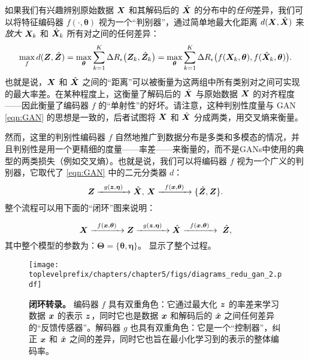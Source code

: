 \documentclass[../../book-main_zh.tex]{subfiles}
\begin{document}
{如果我们有兴趣辨别原始数据 $\bm{X}$ 和其解码后的 $\hat {\bm{X}}$ 的分布中的{\em 任何}差异，我们可以将特征编码器 $f(\cdot, \bm \theta)$ 视为一个“判别器”，通过简单地最大化距离 $d(\bm{X}, \hat {\bm{X}})$ 来{\em 放大} $\bm{X}_k$ 和 $\hat {\bm{X}}_k$ 所有对之间的任何差异：
\begin{equation}
\max_f d(\bm{Z}, \hat {\bm{Z}}) = \max_{\bm \theta} \sum_{k=1}^K \Delta R_\epsilon\big(\bm{Z}_k, \hat{\bm{Z}}_k\big) = \max_{\bm \theta} \sum_{k=1}^K \Delta R_\epsilon\big(f(\bm{X}_k,\bm \theta), f(\hat{\bm{X}}_k,\bm \theta)\big).
    \label{eqn:max-distance}
\end{equation}
也就是说，$\bm{X}$ 和 $\hat {\bm{X}}$ 之间的“距离”可以被衡量为这两组中所有类别对之间可实现的最大率差。在某种程度上，这衡量了解码后的 $\hat {\bm{X}}$ 与原始数据 $\bm{X}$ 的对齐程度——因此衡量了编码器 $f$ 的“单射性”的好坏。请注意，这种判别性度量与 GAN \eqref{eqn:GAN} 的思想是一致的，后者试图将 $\bm{X}$ 和 $\hat {\bm{X}}$ 分成两类，用交叉熵来衡量。

然而，这里的判别性编码器 $f$ 自然地推广到数据分布是多类和多模态的情况，并且判别性是用一个更精细的度量——率差——来衡量的，而不是GANs中使用的典型的两类损失（例如交叉熵）。也就是说，我们可以将编码器 $f$ 视为一个广义的判别器，它取代了 \eqref{eqn:GAN} 中的二元分类器 $d$：
\begin{equation}
 \bm{Z} \xrightarrow{\hspace{2mm} g(\bm{z},\bm \eta) \hspace{2mm}} \hat {\bm{X}}, \, \bm{X} \xrightarrow{\hspace{2mm} f(\bm{x}, \bm \theta)\hspace{2mm}} \{\hat {\bm{Z}}, \bm{Z}\}.
 \label{eqn:closed-loop-GAN}
\end{equation}
整个流程可以用下面的“闭环”图来说明：}
\begin{equation}
    \bm{X} \xrightarrow{\hspace{2mm} f(\bm{x}, \bm \theta)\hspace{2mm}} \bm{Z} \xrightarrow{\hspace{2mm} g(\bm{z},\bm \eta) \hspace{2mm}} \hat {\bm{X}} \xrightarrow{\hspace{2mm} f(\bm{x}, \bm \theta)\hspace{2mm}} \ \hat {\bm{Z}}, 
\end{equation}
其中整个模型的参数为：$\bm \Theta = \{\bm \theta, \bm \eta\}$。  显示了整个过程。

\begin{figure}[t]
{\texttt{[image: \\toplevelprefix/chapters/chapter5/figs/diagrams\_redu\_gan\_2.pdf]}}
\caption{{\bf 闭环转录。} 编码器 $f$ 具有双重角色：它通过最大化 $\bm{z}$ 的率差来学习数据 $\bm{x}$ 的表示 $\bm{z}$，同时它也是数据 $\bm{x}$ 和解码后的 $\hat {\bm{x}}$ 之间任何差异的“反馈传感器”。解码器 $g$ 也具有双重角色：它是一个“控制器”，纠正 $\bm{x}$ 和 $\hat {\bm{x}}$ 之间的差异，同时它也旨在最小化学习到的表示的整体编码率。} \label{fig:auto-encoding-closed} 
\end{figure}
\end{document}
